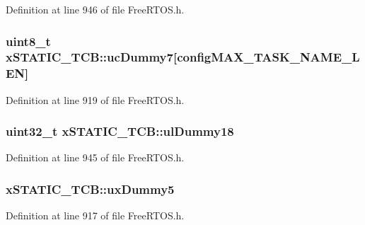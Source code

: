 Definition at line 946 of file Free\+R\+T\+O\+S.\+h.

\subsubsection[{\texorpdfstring{uc\+Dummy7}{ucDummy7}}]{\setlength{\rightskip}{0pt plus 5cm}uint8\+\_\+t x\+S\+T\+A\+T\+I\+C\+\_\+\+T\+C\+B\+::uc\+Dummy7\mbox{[}{\bf config\+M\+A\+X\+\_\+\+T\+A\+S\+K\+\_\+\+N\+A\+M\+E\+\_\+\+L\+EN}\mbox{]}}\hypertarget{structx_s_t_a_t_i_c___t_c_b_a308771ccd6723cad777695d84a0a2a30}{}\label{structx_s_t_a_t_i_c___t_c_b_a308771ccd6723cad777695d84a0a2a30}


Definition at line 919 of file Free\+R\+T\+O\+S.\+h.

\subsubsection[{\texorpdfstring{ul\+Dummy18}{ulDummy18}}]{\setlength{\rightskip}{0pt plus 5cm}uint32\+\_\+t x\+S\+T\+A\+T\+I\+C\+\_\+\+T\+C\+B\+::ul\+Dummy18}\hypertarget{structx_s_t_a_t_i_c___t_c_b_ade6781276f913dcd592ee0f6cce76c7e}{}\label{structx_s_t_a_t_i_c___t_c_b_ade6781276f913dcd592ee0f6cce76c7e}


Definition at line 945 of file Free\+R\+T\+O\+S.\+h.

\subsubsection[{\texorpdfstring{ux\+Dummy5}{uxDummy5}}]{ x\+S\+T\+A\+T\+I\+C\+\_\+\+T\+C\+B\+::ux\+Dummy5}\hypertarget{structx_s_t_a_t_i_c___t_c_b_ab950bb498901ef7291e49086e5a2efd0}{}\label{structx_s_t_a_t_i_c___t_c_b_ab950bb498901ef7291e49086e5a2efd0}


Definition at line 917 of file Free\+R\+T\+O\+S.\+h.

